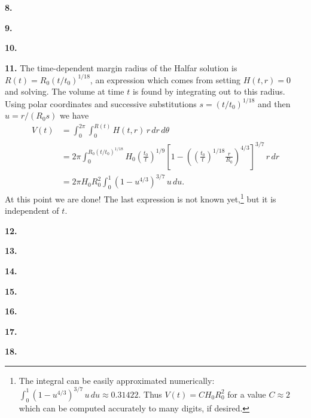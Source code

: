 \documentclass[10pt]{amsart}
\newcommand{\mfile}[1]{
\begin{quote}
\bigskip
\VerbatimInput[frame=single,label=\fbox{\normalsize \textsl{\,#1\,}},fontfamily=courier,fontsize=\footnotesize]{#1}
\end{quote}
}
\newcommand{\prob}[1]{\bigskip\noindent\large\textbf{#1.}\normalsize }
\begin{document}
\prob{8}

\mfile{verifyheat.m}

\prob{9}  

\prob{10}  

\prob{11}  The time-dependent margin radius of the Halfar solution is $R(t) = R_0 (t/t_0)^{1/18}$, an expression which comes from setting $H(t,r)=0$ and solving.  The volume at time $t$ is found by integrating out to this radius.  Using polar coordinates and successive substitutions $s = (t/t_0)^{1/18}$ and then $u=r/(R_0 s)$ we have
\begin{align*}
V(t) &= \int_0^{2\pi} \int_0^{R(t)} H(t,r) \,r\,dr\,d\theta \\
     &= 2\pi \int_0^{R_0 (t/t_0)^{1/18}} H_0 \left(\frac{t_0}{t}\right)^{1/9} \left[1 - \left(\left(\frac{t_0}{t}\right)^{1/18} \frac{r}{R_0}\right)^{4/3}\right]^{3/7} \,r\,dr \\
     &= 2\pi H_0 R_0^2 \int_0^1 \left(1 - u^{4/3}\right)^{3/7} \,u\,du.
\end{align*}
At this point we are done!  The last expression is not known yet,\footnote{The integral can be easily approximated numerically: $\int_0^1 (1 - u^{4/3})^{3/7} \,u\,du \approx 0.31422$.  Thus $V(t) = C H_0 R_0^2$ for a value $C\approx 2$ which can be computed accurately to many digits, if desired.} but it is independent of $t$.

\prob{12}  

\prob{13}  

\prob{14}  

\prob{15}  

\prob{16}  

\prob{17}  

\prob{18}  
\end{document}
